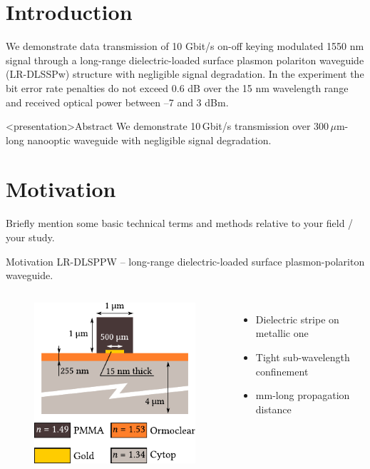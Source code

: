 \section*{Introduction}
  We demonstrate data transmission of 10 Gbit/s on-off keying modulated
  1550 nm signal through a long-range dielectric-loaded surface
  plasmon polariton waveguide (LR-DLSSPw) structure with negligible signal
  degradation. In the experiment the bit error rate penalties do not exceed
  0.6 dB over the 15 nm wavelength range and received optical power
  between --7 and 3 dBm.
  \begin{frame}<presentation>{Abstract}
    We demonstrate 10\,Gbit/s transmission over 300\,$\mu$m-long nanooptic waveguide with negligible signal degradation.
  \end{frame}

\section{Motivation}
  Briefly mention some basic technical terms and methods relative to your field / your study.
  \begin{frame}{Motivation}
    LR-DLSPPW -- long-range dielectric-loaded surface plasmon-polariton waveguide.
    \begin{columns}
        \begin{figure}
          \includegraphics[width=\textwidth]{wg_profile.pdf}
        \end{figure}
        \begin{itemize}
         \item Dielectric stripe on metallic one
         \item Tight sub-wavelength confinement
         \item mm-long propagation distance
        \end{itemize}
    \end{columns}
  \end{frame}



